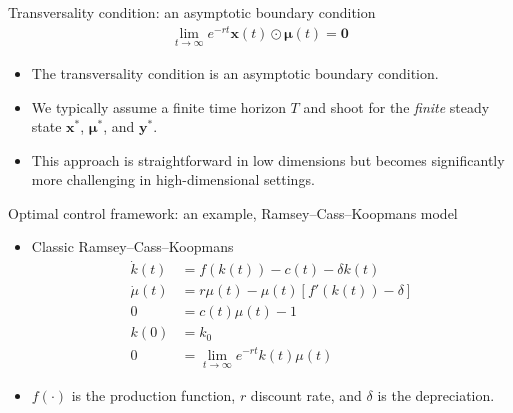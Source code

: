 \documentclass[aspectratio=169,10pt]{beamer}
\begin{document}
\begin{frame}{Transversality condition: an asymptotic boundary condition}
	\begin{align*}
		\lim_{t\rightarrow \infty} e^{-rt} \boldsymbol{x}(t)\odot\boldsymbol{\mu}(t) = \boldsymbol{0}
	\end{align*}
	\begin{itemize}
	\item The transversality condition is an asymptotic boundary condition.
	\item We typically assume a finite time horizon \( T \) and shoot for the \emph{finite} steady state \( \boldsymbol{x}^* \), \( \boldsymbol{\mu}^* \), and \( \boldsymbol{y}^* \).
	\item This approach is straightforward in low dimensions but becomes significantly more challenging in high-dimensional settings.
	\end{itemize}
\end{frame}

\begin{frame}{Optimal control framework: an example, Ramsey–Cass–Koopmans model}
\begin{itemize}
	\item Classic Ramsey–Cass–Koopmans
	\begin{align*}
		\dot{k}(t) &= f\left(k(t)\right) - c(t) - \delta k(t)\\
		\dot{\mu}(t) &= r \mu(t) - \mu(t) \left[f'(k(t)) - \delta \right] \\
		0 &= c(t)\mu(t) - 1\\
		k(0)& = k_0\\
		0 &= \lim_{t\rightarrow \infty} e^{-r t}k(t)\mu(t)
	\end{align*}
\item $f(\cdot)$ is the production function, $r$ discount rate, and $\delta$ is the depreciation.
\end{itemize}
\end{frame}
\end{document}
